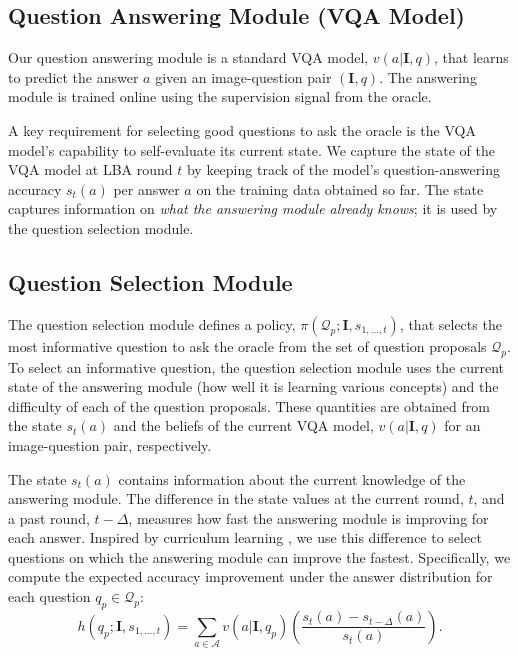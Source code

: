 \documentclass[10pt,twocolumn,letterpaper]{article}
\newcommand{\image}{\mathbf{I}}
\newcommand{\imageQpair}{(\mathbf{I}, q)}
\begin{document}
\subsection{Question Answering Module (VQA Model)}
\label{sec:question-answering}
Our question answering module is a standard VQA model, $v(a | \image, q)$, that learns to predict the answer $a$ given an image-question pair $\imageQpair$. The answering module is trained online using the supervision signal from the oracle. 

A key requirement for selecting good questions to ask the oracle is the VQA model's capability to self-evaluate its current state. We capture the state of the VQA model at LBA round $t$ by keeping track of the model's question-answering accuracy $s_t(a)$ per answer $a$ on the training data obtained so far. The state captures information on \emph{what the answering module already knows}; it is used by the question selection module.


\vspace{-0.05in}
\subsection{Question Selection Module}
\label{sec:selection-policy}
\vspace{-0.05in}

The question selection module defines a policy, $\pi(\mathcal{Q}_p; \image, s_{1, \dots, t})$, that selects the most informative question to ask the oracle from the set of question proposals $\mathcal{Q}_p$.
To select an informative question, the question selection module uses the current state of the answering module (how well it is learning various concepts) and the difficulty of each of the question proposals. These quantities are obtained from the state $s_t(a)$ and the beliefs of the current VQA model, $v(a | \image, q)$ for an image-question pair, respectively. 

The state $s_t(a)$ contains information about the current knowledge of the answering module. The difference in the state values at the current round, $t$, and a past round, $t-\Delta$, measures how fast the answering module is improving for each answer. Inspired by curriculum learning \citep{bengio2009curriculum,kumar2010self,baranes2013active,sachan2016easy}, we use this difference to select questions on which the answering module can improve the fastest. Specifically, we compute the expected accuracy improvement under the answer distribution for each question $q_p \in \mathcal{Q}_p$:
\begin{equation}
h(q_p; \image, s_{1, \dots, t}) = \sum_{a \in \mathcal{A}} v(a | \image, q_p) \left( \frac{s_{t}(a) - s_{t-\Delta}(a)}{s_{t}(a)} \right). \label{eqn:selection-score}
\end{equation}
\end{document}
